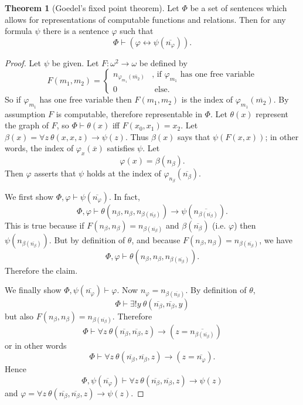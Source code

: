 \documentclass[12pt]{report}
\renewcommand{\iff}{\leftrightarrow}
\newcommand{\proves}{\vdash}
\theoremstyle{definition}
\newtheorem{theorem}{Theorem}[chapter]
\begin{document}
\begin{theorem}[Goedel's fixed point theorem]
Let $\Phi$ be a set of sentences which allows for representations of computable functions and relations. Then for any formula $\psi$ there is a sentence $\varphi$ such that
$$\Phi \proves (\varphi \iff \psi(\overline{n_\varphi})).$$
\end{theorem}
\begin{proof}
Let $\psi$ be given. Let $F: \omega^2 \to \omega$ be defined by
$$F(m_1, m_2) = \begin{cases}
  n_{\varphi_{m_1}(\overline{m_2})}&\text{, if $\varphi_{m_1}$ has one free variable}\\
  0&\text{ else.}
\end{cases}$$
So if $\varphi_{m_1}$ has one free variable then $F(m_1, m_2)$ is the index of $\varphi_{m_1}(\overline{m_2})$. By assumption $F$ is computable, therefore representable in $\Phi$.
Let $\theta(x)$ represent the graph of $F$, so $\Phi \proves \theta(x)$ iff $F(x_0, x_1) = x_2$.
Let $\beta(x) = \forall z ~\theta(x, x, z) \to \psi(z)$. Thus $\beta(x)$ says that $\psi(F(x, x))$; in other words, the index of $\varphi_x(\overline x)$ satisfies $\psi$.
Let
$$\varphi(x) = \beta(n_\beta).$$
Then $\varphi$ asserts that $\psi$ holds at the index of $\varphi_{n_\beta}(\overline{n_\beta})$.

We first show $\Phi, \varphi \proves \psi(\overline{n_\varphi})$. In fact,
$$\Phi, \varphi \proves \theta(n_\beta, n_\beta, n_{\beta(\overline{n_\beta})}) \to \psi(\overline{n_{\beta(\overline{n_\beta})}}).$$
This is true because if $F(n_\beta, n_\beta) = n_{\beta(\overline{n_\beta})}$ and $\beta(\overline{n_\beta})$ (i.e. $\varphi$) then $\psi(n_{\beta(\overline{n_\beta})})$.
But by definition of $\theta$, and because $F(n_\beta, n_\beta) = n_{\beta(\overline{n_\beta})}$, we have
$$\Phi, \varphi \proves \theta(n_\beta, n_\beta, n_{\beta(\overline{n_\beta})}).$$
Therefore the claim.

We finally show $\Phi, \psi(\overline{n_\varphi}) \proves \varphi$. Now $n_\varphi = n_{\beta(\overline{n_\beta})}$. By definition of $\theta$,
$$\Phi \proves \exists!y~\theta(\overline{n_\beta}, \overline{n_\beta}, y)$$
but also $F(n_\beta, n_\beta) = n_{\beta(\overline{n_\beta})}$. Therefore
$$\Phi \proves \forall z~\theta(\overline{n_\beta}, \overline{n_\beta}, z) \to (z = \overline{n_{\beta(\overline{n_\beta})}})$$
or in other words
$$\Phi \proves \forall z~\theta(\overline{n_\beta}, \overline{n_\beta}, z) \to (z = \overline{n_\varphi}).$$
Hence
$$\Phi, \psi(\overline{n_\varphi}) \proves \forall z~\theta(\overline{n_\beta}, \overline{n_\beta}, z) \to \psi(z)$$
and $\varphi = \forall z~\theta(\overline{n_\beta}, \overline{n_\beta}, z) \to \psi(z)$.
\end{proof}
\end{document}
